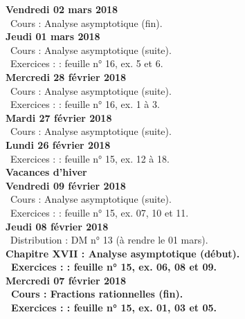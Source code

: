 \documentclass[12pt,a4paper]{article}
\begin{document}
\noindent\textbf{Vendredi 02 mars 2018}\\
\bu\ Cours : Analyse asymptotique (fin).\vspace{.4cm}\\

\noindent\textbf{Jeudi 01 mars 2018}\\
\bu\ Cours : Analyse asymptotique (suite).\\
\bu\ Exercices : : feuille n° 16, ex. 5 et 6.\vspace{.4cm}\\

\noindent\textbf{Mercredi 28 février 2018} \\
\bu\ Cours : Analyse asymptotique (suite).\\
\bu\ Exercices : : feuille n° 16, ex. 1 à 3.\vspace{.4cm}\\

\noindent\textbf{Mardi 27 février 2018} \\
\bu\ Cours : Analyse asymptotique (suite).\vspace{.4cm}\\

\noindent\textbf{\bf Lundi 26 février 2018} \\
\bu\ Exercices : : feuille n° 15, ex. 12 à 18.\vspace{.4cm}\\

\noindent\textbf{\bf Vacances d'hiver }\\

\noindent\textbf{Vendredi 09 février 2018}\\
\bu\ Cours : Analyse asymptotique (suite).\\
\bu\ Exercices : : feuille n° 15, ex. 07, 10 et 11.\vspace{.4cm}\\

\noindent\textbf{Jeudi 08 février 2018}\\
\bu\ Distribution : DM n° 13 (à rendre le 01 mars).\\
\bf Chapitre XVII \rm : Analyse asymptotique (début).\\
\bu\ Exercices : : feuille n° 15, ex. 06, 08 et 09.\vspace{.4cm}\\

\noindent\textbf{Mercredi 07 février 2018} \\
\bu\ Cours : Fractions rationnelles (fin).\\
\bu\ Exercices : : feuille n° 15, ex. 01, 03 et 05.\vspace{.4cm}\\
\end{document}

